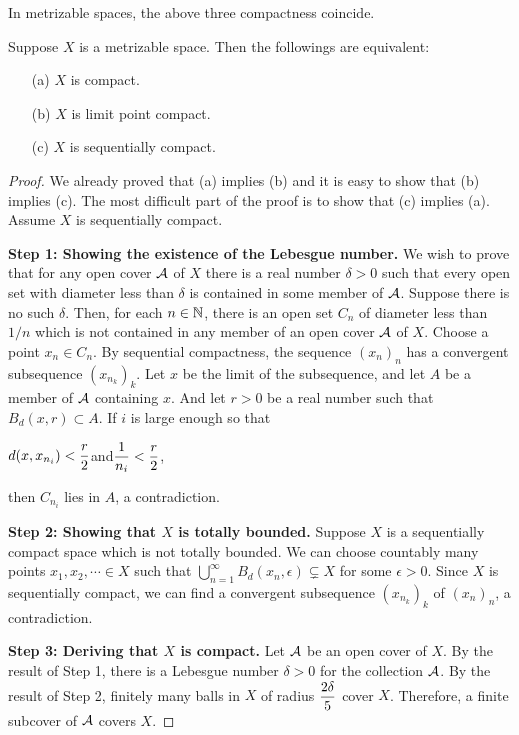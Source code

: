 In metrizable spaces, the above three compactness coincide.
\begin{thm}
    Suppose $X$ is a metrizable space.
    Then the followings are equivalent:
    \begin{enumerate}
        \item[(a)]
        {
            $X$ is compact.
        }
        \item[(b)]
        {
            $X$ is limit point compact.
        }
        \item[(c)]
        {
            $X$ is sequentially compact.
        }
    \end{enumerate}
\end{thm}
\begin{proof}
    We already proved that (a) implies (b) and it is easy to show that (b) implies (c).
    The most difficult part of the proof is to show that (c) implies (a).
    Assume $X$ is sequentially compact.
    
    \textbf{Step 1: Showing the existence of the Lebesgue number.}\newline\indent
    We wish to prove that for any open cover ${\mathcal{A}}$ of $X$ there is a real number $\delta>0$ such that every open set with diameter less than $\delta$ is contained in some member of ${\mathcal{A}}$.
    Suppose there is no such $\delta$.
    Then, for each $n\in{\mathbb{N}}$, there is an open set $C_n$ of diameter less than $1/n$ which is not contained in any member of an open cover ${\mathcal{A}}$ of $X$.
    Choose a point $x_n\in C_n$.
    By sequential compactness, the sequence $(x_n)_n$ has a convergent subsequence $(x_{n_k})_k$.
    Let $x$ be the limit of the subsequence, and let $A$ be a member of ${\mathcal{A}}$ containing $x$.
    And let $r>0$ be a real number such that $B_d(x, r)\subset A$.
    If $i$ is large enough so that
    \begin{center}
        $\displaystyle{d(x, x_{n_i})<\frac{r}{2}}$\quad and\quad$\displaystyle{\frac{1}{n_i}<\frac{r}{2}}$,
    \end{center}
    then $C_{n_i}$ lies in $A$, a contradiction.
    
    \textbf{Step 2: Showing that $X$ is totally bounded.}\newline\indent
    Suppose $X$ is a sequentially compact space which is not totally bounded.
    We can choose countably many points $x_1, x_2, \cdots\in X$ such that $\bigcup_{n=1}^\infty B_d(x_n, \epsilon)\subsetneq X$ for some $\epsilon>0$.
    Since $X$ is sequentially compact, we can find a convergent subsequence $(x_{n_k})_k$ of $(x_n)_n$, a contradiction.
    
    \textbf{Step 3: Deriving that $X$ is compact.}\newline\indent
    Let ${\mathcal{A}}$ be an open cover of $X$.
    By the result of Step 1, there is a Lebesgue number $\delta>0$ for the collection ${\mathcal{A}}$.
    By the result of Step 2, finitely many balls in $X$ of radius $\displaystyle{\frac{2\delta}{5}}$ cover $X$.
    Therefore, a finite subcover of ${\mathcal{A}}$ covers $X$. 
\end{proof}

